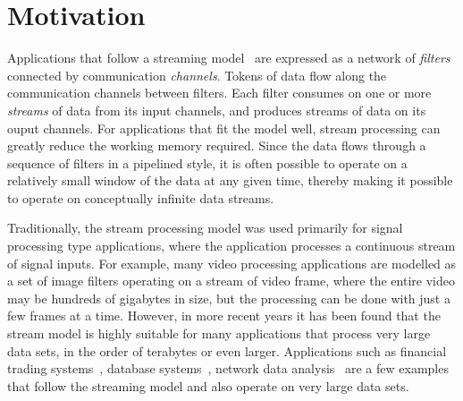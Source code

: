 \documentclass[10pt, conference, compsocconf, reqno]{IEEEtran}
\begin{document}


%
\IEEEpeerreviewmaketitle
\section{Motivation}

Applications that follow a streaming model~\cite{Thies:2002:SLS:647478.727935,Halbwachs91thesynchronous,Stephens95asurvey,muthukrishnan2005data}
are expressed as a network of \textit{filters} connected by communication
\textit{channels}. Tokens of data flow along the communication channels
between filters. Each filter consumes on one or more \textit{streams}
of data from its input channels, and produces streams of data on its
ouput channels. For applications that fit the model well, stream processing
can greatly reduce the working memory required. Since the data flows through
a sequence of filters in a pipelined style, it is often possible to
operate on a relatively small window of the data at any given time,
thereby making it possible to operate on conceptually infinite
data streams.

Traditionally, the stream processing model was used primarily
for signal processing type applications, where the application
processes a continuous stream of signal inputs. For example,
many video processing applications are modelled as a set of
image filters operating on a stream of video frame, where the
entire video may be hundreds of gigabytes in size, but the
processing can be done with just a few frames at a time.
However, in more recent years it has been found that the stream
model is highly suitable for many applications that process
very large data sets, in the order of terabytes or even larger.
Applications such as financial trading
systems~\cite{agarwal2009faster},
database systems~\cite{Golab03datastream},
network data analysis~\cite{Gilbert01quicksand:quick,Sullivan:1998:TSM:1268256.1268258} are a few examples that follow the streaming model and also operate on very large data sets.
\end{document}
